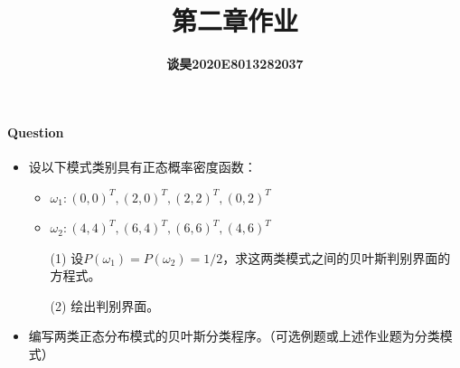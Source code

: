 \documentclass[UTF8,a4paper]{ctexart}
\title{\bfseries 第二章作业 }
\author{\bfseries 谈昊\quad2020E8013282037}
\date{}
\begin{document}
\maketitle



\paragraph{Question}
\begin{itemize}
    \item 设以下模式类别具有正态概率密度函数：
    \begin{itemize}
        \item $\omega _1 :{(0,0)^T, (2 ,0)^T, (2 ,2)^T, (0 ,2)^T}$
        \item $\omega _2:{(4 ,4)^T, (6 ,4)^T, (6 ,6)^T, (4 ,6)^T}$
    \end{itemize}

    \begin{itemize}
        \item[(1)] 设$P(\omega _1)= P(\omega _2)=1/2$，求这两类模式之间的贝叶斯判别界面的方程式。
        \item[(2)] 绘出判别界面。
    \end{itemize}
    \item 编写两类正态分布模式的贝叶斯分类程序。（可选例题或上述作业题为分类模式）

\end{itemize}
\end{document}
